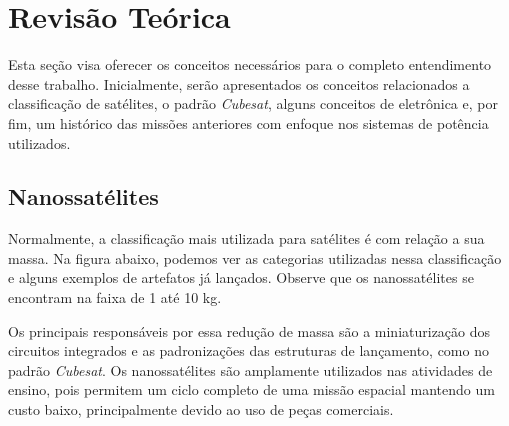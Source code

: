 \chapter{Revisão Teórica} \label{revisao}

Esta seção visa oferecer os conceitos necessários para o completo entendimento desse trabalho. Inicialmente, serão apresentados os conceitos relacionados a classificação de satélites, o padrão \textit{Cubesat}, alguns conceitos de eletrônica e, por fim, um histórico das missões anteriores com enfoque nos sistemas de potência utilizados.

\section{Nanossatélites}\label{nanosats_revision}
Normalmente, a classificação mais utilizada para satélites é com relação a sua massa. Na figura abaixo, podemos ver as categorias utilizadas nessa classificação e alguns exemplos de artefatos já lançados. Observe que os nanossatélites se encontram na faixa de 1 até 10 kg.

\noindent
\begin{minipage}{\linewidth}
\label{mass_classification_fig}
\end{minipage}

 Os principais responsáveis por essa redução de massa são a miniaturização dos circuitos integrados e as padronizações das estruturas de lançamento, como no padrão \textit{Cubesat}. Os nanossatélites são amplamente utilizados nas atividades de ensino, pois permitem um ciclo completo de uma missão espacial mantendo um custo baixo, principalmente devido ao uso de peças comerciais.\cite{barnhart_ref}

